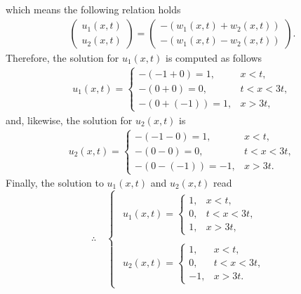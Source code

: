 \documentclass[12pt]{article}
\begin{document}
which means the following relation holds
\begin{align*}
	\begin{pmatrix}
		u_{1}(x,t) \\ u_{2}(x,t)
	\end{pmatrix}
	=
	\begin{pmatrix}
		-\left(w_{1}(x,t) + w_{2}(x,t)\right) \\
		-\left(w_{1}(x,t) - w_{2}(x,t)\right)
	\end{pmatrix}.
\end{align*}
Therefore, the solution for $u_{1}(x,t)$ is computed as follows
\begin{align*}
	u_1(x, t)
	=
	\begin{cases}
		-(-1+0)=1,   & x < t,      \\
		-(0+0)=0,    & t < x < 3t, \\
		-(0+(-1))=1, & x > 3t,
	\end{cases}
\end{align*}
and, likewise, the solution for $u_{2}(x,t)$ is
\begin{align*}
	u_2(x, t)
	=
	\begin{cases}
		-(-1-0)=1,    & x < t,      \\
		-(0-0)=0,     & t < x < 3t, \\
		-(0-(-1))=-1, & x > 3t.
	\end{cases}
\end{align*}
Finally, the solution to $u_{1}(x,t)$ and $u_{2}(x,t)$ read
\begin{equation*}
	\therefore\quad
	\boxed{
		\begin{cases}
			\begin{aligned}
				u_1(x, t)
				=
				\begin{cases}
					1, & x < t,      \\
					0, & t < x < 3t, \\
					1, & x > 3t,
				\end{cases}
			\end{aligned} \\
			\begin{aligned}
				u_2(x, t)
				=
				\begin{cases}
					1,  & x < t,      \\
					0,  & t < x < 3t, \\
					-1, & x > 3t.
				\end{cases}
			\end{aligned}
		\end{cases}
	}
\end{equation*}
\clearpage
\end{document}
